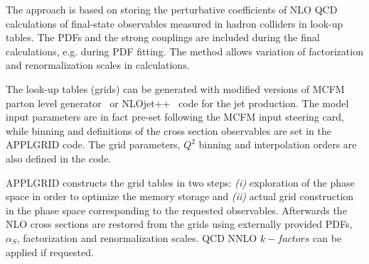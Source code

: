 \begin{description}
The approach is based on storing the perturbative coefficients
of NLO QCD calculations of final-state observables measured
in hadron colliders in look-up tables. The PDFs and the 
strong couplings are included during the final calculations,
e.g. during PDF fitting. The method allows 
variation of factorization and renormalization scales in
calculations.

The look-up tables (grids) can be generated with modified versions
of MCFM parton level generator~\cite{Campbell:1999ah,Campbell:2010ff} 
or NLOjet++~\cite{Nagy:2001fj} code for the jet production.
The model input parameters are in fact pre-set following the 
MCFM input steering card, while binning and definitions of the
cross section observables are set in the APPLGRID code.
%
The grid parameters, \(Q^2\) binning
and interpolation orders are also defined in the code.

APPLGRID constructs the grid tables in two 
steps: {\it (i)} exploration of the phase space in order
to optimize the memory storage and {\it (ii)} actual grid
construction in the phase space corresponding to the 
requested observables.
Afterwards the NLO cross sections are restored from the grids
using externally provided PDFs, \(\alpha_S\), factorization and 
renormalization scales. QCD NNLO $k-factors$ can be applied
if requested.

\end{description}




